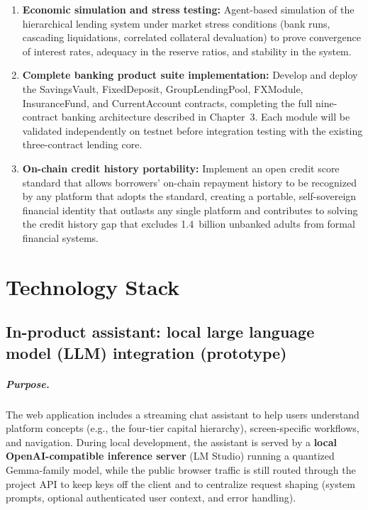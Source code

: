 \documentclass[12pt,a4paper]{report}  %
\begin{document}
\begin{enumerate}[noitemsep]
\item \textbf{Economic simulation and stress testing:} Agent-based simulation of the hierarchical lending system under market stress conditions (bank runs, cascading liquidations, correlated collateral devaluation) to prove convergence of interest rates, adequacy in the reserve ratios, and stability in the system.
\item \textbf{Complete banking product suite implementation:} Develop and deploy the SavingsVault, FixedDeposit, GroupLendingPool, FXModule, InsuranceFund, and CurrentAccount contracts, completing the full nine-contract banking architecture described in Chapter~3. Each module will be validated independently on testnet before integration testing with the existing three-contract lending core.
\item \textbf{On-chain credit history portability:} Implement an open credit score standard that allows borrowers' on-chain repayment history to be recognized by any platform that adopts the standard, creating a portable, self-sovereign financial identity that outlasts any single platform and contributes to solving the credit history gap that excludes 1.4~billion unbanked adults from formal financial systems.
\end{enumerate}


\appendix

\chapter{Technology Stack}

\section{In-product assistant: local large language model (LLM) integration (prototype)}

\paragraph{Purpose.}
The web application includes a streaming chat assistant to help users understand platform concepts (e.g., the four-tier capital hierarchy), screen-specific workflows, and navigation. During local development, the assistant is served by a \textbf{local OpenAI-compatible inference server} (LM Studio) running a quantized Gemma-family model, while the public browser traffic is still routed through the project API to keep keys off the client and to centralize request shaping (system prompts, optional authenticated user context, and error handling).
\end{document}
